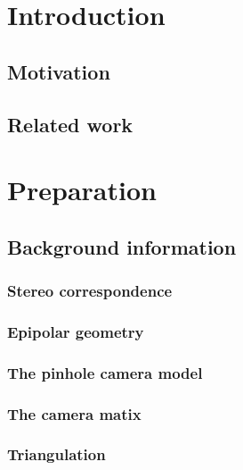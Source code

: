 \documentclass[12pt,a4paper,twoside,openright]{report}
\begin{document}
\bigskip
{}

\medskip
{}

\tableofcontents

\listoffigures

\newpage


\pagestyle{headings}

\chapter{Introduction}
\section{Motivation}
\section{}
\section{Related work}

\chapter{Preparation}

\section{Background information}
\subsection{Stereo correspondence}
\subsection{Epipolar geometry}
\subsection{The pinhole camera model}
\subsection{The camera matix}
\subsection{Triangulation}
\end{document}

